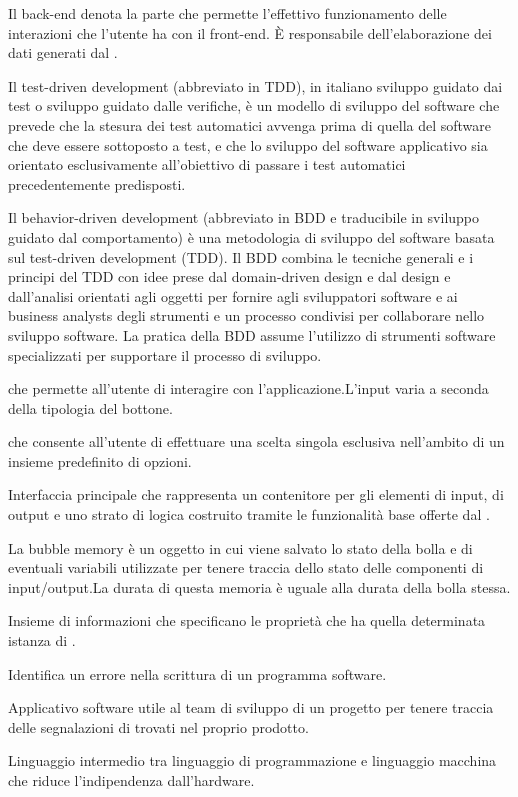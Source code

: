 Il back-end denota la parte che permette l’effettivo funzionamento delle interazioni che l’utente ha con il front-end. \`{E} responsabile dell’elaborazione dei dati generati dal .

Il test-driven development (abbreviato in TDD), in italiano sviluppo guidato dai test o sviluppo guidato dalle verifiche, è un modello di sviluppo del software che prevede che la stesura dei test automatici avvenga prima di quella del software che deve essere sottoposto a test, e che lo sviluppo del software applicativo sia orientato esclusivamente all'obiettivo di passare i test automatici precedentemente predisposti.

Il behavior-driven development (abbreviato in BDD e traducibile in sviluppo guidato dal comportamento) è una metodologia di sviluppo del software basata sul test-driven development (TDD). Il BDD combina le tecniche generali e i principi del TDD con idee prese dal domain-driven design e dal design e dall'analisi orientati agli oggetti per fornire agli sviluppatori software e ai business analysts degli strumenti e un processo condivisi per collaborare nello sviluppo software. La pratica della BDD assume l'utilizzo di strumenti software specializzati per supportare il processo di sviluppo.

 che permette all’utente di interagire con l’applicazione.L’input varia a seconda della tipologia del bottone.  

 che consente all'utente di effettuare una scelta singola esclusiva nell'ambito di un insieme predefinito di opzioni.


Interfaccia principale che rappresenta un contenitore per gli elementi di input, di output e uno strato di logica costruito tramite le funzionalit\`a base offerte dal .

La bubble memory è un oggetto  in cui viene salvato lo stato della bolla e di eventuali variabili utilizzate per tenere traccia dello stato delle componenti di input/output.La durata di questa memoria è uguale alla durata della bolla stessa.

Insieme di informazioni che specificano le proprietà  che ha quella determinata istanza di .

Identifica un errore nella scrittura di un programma software.

Applicativo software utile al team di sviluppo di un progetto per tenere traccia delle segnalazioni di  trovati nel proprio prodotto.
 
Linguaggio intermedio tra linguaggio di programmazione e linguaggio macchina che riduce l'indipendenza dall'hardware.
\clearpage